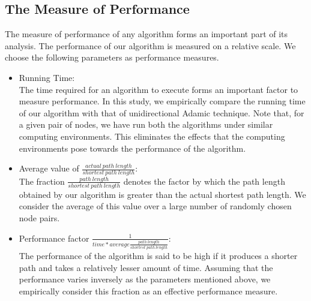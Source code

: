 \documentclass[a4paper,12pt]{article}
\begin{document}
\subsection{The Measure of Performance}
The measure of performance of any algorithm forms an important part of its analysis. The performance of our algorithm is measured on a relative scale.  We choose the following parameters as performance measures.
\begin{itemize}
	\item Running Time: \\
	The time required for an algorithm to execute forms an important factor to measure performance. In this study, we empirically compare the running time of our algorithm with that of unidirectional Adamic technique. Note that, for a given pair of nodes, we have run both the algorithms under similar computing environments. This eliminates the effects that the computing environments pose towards the performance of the algorithm.
	
	\item Average value of $\frac{actual\ path\ length }{shortest\ path\ length}$: \\
	The fraction $\frac{path\ length }{shortest\ path\ length}$ denotes the factor by which the path length obtained by our algorithm is greater than the actual shortest path length. We consider the average of this value over a large number of randomly chosen node pairs.
	
	\item Performance factor $\frac{1}{time*average \frac{path\ length}{shortest\ path\ length}}$: \\
	The performance of the algorithm is said to be high if it produces a shorter path and takes a relatively lesser amount of time. Assuming that the performance varies inversely as the parameters mentioned above, we empirically consider this fraction as an effective performance measure.
\end{itemize}
\end{document}
